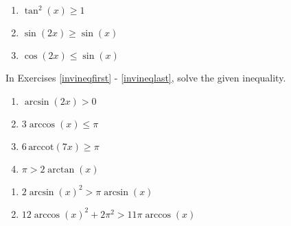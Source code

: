 \begin{multicols}{3}

\begin{enumerate}

\setcounter{enumi}{\value{HW}}

\item $\tan^{2} \left( x \right) \geq 1$
\item $\sin(2x) \geq \sin(x)$
\item $\cos(2x) \leq \sin(x)$ \label{thirdineqlast}

\setcounter{HW}{\value{enumi}}

\end{enumerate}

\end{multicols}

In Exercises \ref{invineqfirst} - \ref{invineqlast}, solve the given inequality.

\begin{multicols}{4}

\begin{enumerate}

\setcounter{enumi}{\value{HW}}

\item $\arcsin(2x) > 0$ \label{invineqfirst}  
\item $3 \arccos(x) \leq \pi$
\item $6 \, \text{arccot}(7x) \geq \pi$  
\item $\pi > 2\arctan(x)$ 

\setcounter{HW}{\value{enumi}}

\end{enumerate}

\end{multicols}

\begin{multicols}{2}

\begin{enumerate}

\setcounter{enumi}{\value{HW}}

\item $2\arcsin(x)^2 > \pi \arcsin(x)$  
\item $12 \arccos(x)^2+2\pi^2>11\pi \arccos(x)$ \label{invineqlast} 

\setcounter{HW}{\value{enumi}}

\end{enumerate}

\end{multicols}

